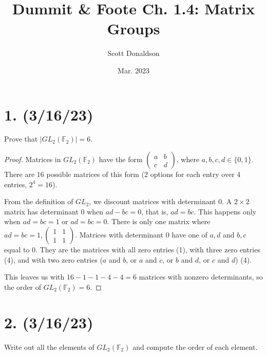 \documentclass{article}
\title{Dummit \& Foote Ch. 1.4: Matrix Groups}
\author{Scott Donaldson}
\date{Mar. 2023}
\begin{document}
\maketitle

\section*{1. (3/16/23)}

Prove that $|GL_2(\mathbb{F}_2)| = 6$.

\begin{proof}
    Matrices in $GL_2(\mathbb{F}_2)$ have the form 
    $\begin{pmatrix}a & b\\c & d\end{pmatrix}$, 
    where $a, b, c, d \in \{0, 1\}$. There are 16 possible matrices of this form (2 options for each entry over 4 entries, $2^4 = 16$).
    
    From the definition of $GL_2$, we discount matrices with determinant 0. A $2 \times 2$ matrix has determinant 0 when $ad - bc = 0$, that is, $ad = bc$. This happens only when $ad = bc = 1$ or $ad = bc = 0$. There is only one matrix where $ad = bc = 1, \begin{pmatrix}1 & 1\\1 & 1\end{pmatrix}$. Matrices with determinant 0 have one of $a, d$ and $b, c$ equal to 0. They are the matrices with all zero entries (1), with three zero entries (4), and with two zero entries ($a$ and $b$, or $a$ and $c$, or $b$ and $d$, or $c$ and $d$) (4).

    This leaves us with $16 - 1 - 1 - 4 - 4 = 6$ matrices with nonzero determinants, so the order of $GL_2(\mathbb{F}_2) = 6$.
\end{proof}

\section*{2. (3/16/23)}

Write out all the elements of $GL_2(\mathbb{F}_2)$ and compute the order of each element.
\end{document}

